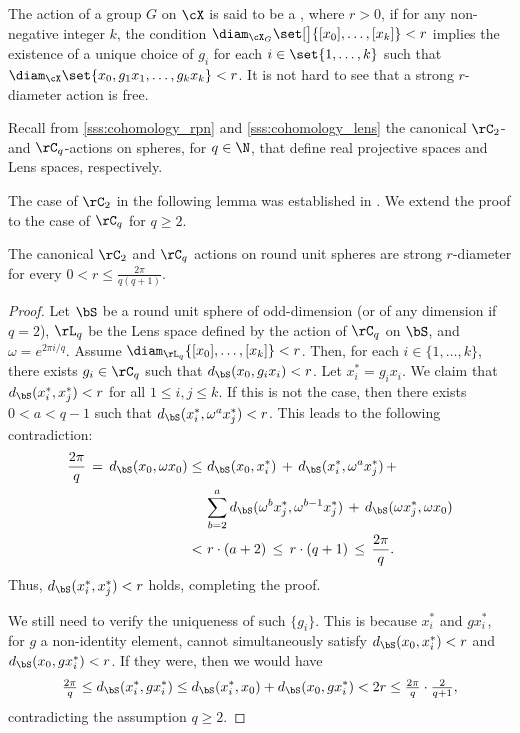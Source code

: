\subsubsection{}\label{sss:strong_r_action}

The action of a group $G$ on $\cX$ is said to be a , where $r > 0$, if for any non-negative integer $k$, the condition $\diam_{\cX_G}\set[\big]{[x_0],\dots,[x_k]} < r$ implies the existence of a unique choice of $g_i$ for each $i \in \set{1,\dots,k}$ such that $\diam_{\cX}\set{x_0, g_1x_1, \dots, g_kx_k} < r$.
It is not hard to see that a strong $r$-diameter action is free.

Recall from \cref{sss:cohomology_rpn} and \cref{sss:cohomology_lens} the canonical $\rC_2$- and $\rC_q$-actions on spheres, for $q \in \N$, that define real projective spaces and Lens spaces, respectively.

The case of $\rC_2$ in the following lemma was established in \cite[Cor.~4.3]{adams2022metric}. We extend the proof to the case of $\rC_q$ for \(q \geq 2\).

\lemma
The canonical $\rC_2$ and $\rC_q$ actions on round unit spheres are strong $r$-diameter for every $0 < r \leq \tfrac{2\pi}{q(q+1)}$.

\begin{proof}
	Let $\bS$ be a round unit sphere of odd-dimension (or of any dimension if $q=2$), $\rL_q$ be the Lens space defined by the action of \(\rC_q\) on \(\bS\), and $\omega = e^{2\pi i/q}$.
	Assume $\diam_{\rL_q}\{[x_0], \dots, [x_k]\} < r$.
	Then, for each $i \in \{1, \dots, k\}$, there exists $g_i \in \rC_q$ such that $d_{\bS}(x_0, g_i x_i) < r$. Let $x_i^* = g_i x_i$. We claim that $d_{\bS}(x_i^*, x_j^*) < r$ for all $1 \leq i, j \leq k$.
	If this is not the case, then there exists $0 < a < q-1$ such that $d_{\bS}(x_i^*, \omega^a x_j^*) < r$.
	This leads to the following	contradiction:
	\begin{align*}
		\frac{2\pi}{q} \,=\, d_{\bS}(x_0, \omega x_0)
		\leq\, & \, d_{\bS}(x_0, x_i^*) \, + \, d_{\bS}(x_i^*, \omega^a x_j^*) \, + \, \\
		& \sum_{b=2}^a d_{\bS}(\omega^b x_j^*, \omega^{b-1} x_j^*) \, + \, d_{\bS}(\omega x_j^*, \omega x_0)\\
		< \, & \, r \cdot (a + 2) \, \leq \, r \cdot (q + 1) \, \leq \, \frac{2\pi}{q}.
	\end{align*}
	Thus, $d_{\bS}(x_i^*, x_j^*) < r$ holds, completing the proof.

	We still need to verify the uniqueness of such $\{g_i\}$.
	This is because $x_i^*$ and $gx_i^*$, for $g$ a non-identity element, cannot simultaneously satisfy $d_{\bS}(x_0, x_i^*) < r$ and $d_{\bS}(x_0, gx_i^*) < r$.
	If they were, then we would have
	\[\tfrac{2\pi}{q} \leq d_{\bS}(x_i^*, gx_i^*) \leq d_{\bS}(x_i^*, x_0) + d_{\bS}(x_0, gx_i^*) < 2r \leq \tfrac{2\pi}{q} \cdot \tfrac{2}{q+1},
	\]
	contradicting the assumption $q \geq 2$.
\end{proof}

